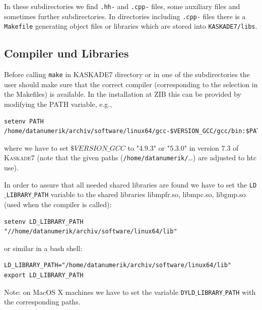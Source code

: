 \documentclass[11pt]{article}
\newcommand{\K}{\textsc{Kaskade7 }}
\begin{document}
\noindent In these subdirectories we find {\tt .hh-} and {\tt .cpp-} files, some auxiliary files and sometimes further subdirectories.
In directories including {\tt .cpp-} files there is a {\tt Makefile} generating object files or libraries which are stored into
{\tt KASKADE7/libs}.

\subsection{Compiler und Libraries}\label{sec:comp_and_lib}

Before calling {\tt make} in KASKADE7 directory or in one of the subdirectories
the user should make sure that the correct compiler (corresponding to the selection in the Makefiles)
is available. In the installation at ZIB this can be provided by modifying the
PATH variable, e.g.,

\begin{scriptsize}
\begin{verbatim}
setenv PATH /home/datanumerik/archiv/software/linux64/gcc-$VERSION_GCC/gcc/bin:$PATH
\end{verbatim}
\end{scriptsize}

\noindent where we have to set $\$VERSION\_GCC$ to "4.9.3" or "5.3.0" in version
7.3 of \K (note that the given paths (\verb|/home/datanumerik/|\dots) are adjusted to htc use).

\noindent In order to assure that all needed shared libraries are found we have to set the 
{\tt LD$\_$LIBRARY$\_$PATH} variable to the shared libraries 
libmpfr.so, libmpc.so, libgmp.so (used when the compiler is called):

\begin{scriptsize}
\begin{verbatim}
setenv LD_LIBRARY_PATH "//home/datanumerik/archiv/software/linux64/lib"
\end{verbatim}
\end{scriptsize}

\noindent or similar in a bash shell:

\begin{scriptsize}
\begin{verbatim}
LD_LIBRARY_PATH="/home/datanumerik/archiv/software/linux64/lib"
export LD_LIBRARY_PATH
\end{verbatim}
\end{scriptsize}

Note: on MacOS X machines we have to set the variable  {\tt DYLD$\_$LIBRARY$\_$PATH}
with the corresponding paths.
\end{document}
